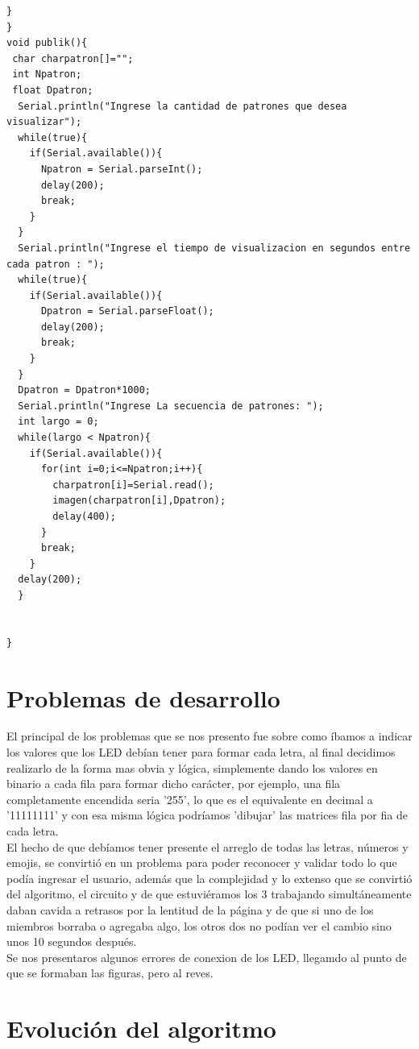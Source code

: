 \documentclass{article}
\begin{document}
\begin{lstlisting}[style=myArduino]
  }
}
void publik(){
 char charpatron[]="";
 int Npatron;
 float Dpatron;
  Serial.println("Ingrese la cantidad de patrones que desea visualizar");
  while(true){
    if(Serial.available()){
  	  Npatron = Serial.parseInt();
      delay(200);
      break;
    }
  }
  Serial.println("Ingrese el tiempo de visualizacion en segundos entre cada patron : ");
  while(true){
    if(Serial.available()){
  	  Dpatron = Serial.parseFloat();
      delay(200);
      break;
    }
  }
  Dpatron = Dpatron*1000;
  Serial.println("Ingrese La secuencia de patrones: ");
  int largo = 0;
  while(largo < Npatron){
    if(Serial.available()){
      for(int i=0;i<=Npatron;i++){
        charpatron[i]=Serial.read();
        imagen(charpatron[i],Dpatron);
        delay(400);
      }
      break;
    }
  delay(200);
  }
 
  
}
\end{lstlisting}

\section{Problemas de desarrollo} \label{conclulsion}
El principal de los problemas que se nos presento fue sobre como íbamos a indicar los valores que los LED debían tener para formar cada letra, al final decidimos realizarlo de la forma mas obvia y lógica, simplemente dando los valores en binario a cada fila para formar dicho carácter, por ejemplo, una fila completamente encendida seria '255', lo que es el equivalente en decimal a '11111111' y con esa misma lógica podríamos  'dibujar' las matrices fila por fia de cada letra. \\


El hecho de que debíamos tener presente el arreglo de todas las letras, números y emojis, se convirtió en un problema para poder reconocer y validar todo lo que podía ingresar el usuario, además que la complejidad y lo extenso que se convirtió del algoritmo, el circuito y de que estuviéramos los 3 trabajando simultáneamente daban cavida a retrasos por la lentitud de la página y de que si uno de los miembros borraba o agregaba algo, los otros dos no podían ver el cambio sino unos 10 segundos después.\\

Se nos presentaros algunos errores de conexion de los LED, llegamdo al punto de que se formaban las figuras, pero al reves.\\


\section{Evolución del algoritmo} \label{conclulsion}
\end{document}
